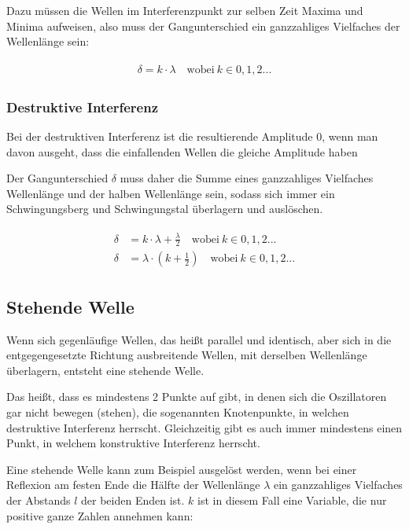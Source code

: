	Dazu müssen die Wellen im Interferenzpunkt zur selben Zeit Maxima und Minima aufweisen, also muss der Gangunterschied ein ganzzahliges Vielfaches der Wellenlänge sein:
	
	\begin{align}	\label{eq:kon_interferenz}
	\begin{split}
		\delta = k \cdot \lambda \quad \text{wobei} \ k \in 0,1,2...
	\end{split}
	\end{align}
	
	\subsubsection{Destruktive Interferenz}
	
	Bei der destruktiven Interferenz ist die resultierende Amplitude 0, wenn man davon ausgeht, dass die einfallenden Wellen die gleiche Amplitude haben
	
	Der Gangunterschied $\delta$ muss daher die Summe eines ganzzahliges Vielfaches Wellenlänge und der halben Wellenlänge sein, sodass sich immer ein Schwingungsberg und Schwingungstal überlagern und auslöschen.
	
	\begin{align}
	\begin{split}
		\delta &= k \cdot \lambda + \frac{\lambda}{2} \quad \text{wobei} \ k \in 0,1,2... \\
		\delta &= \lambda \cdot (k + \frac{1}{2}) \quad \text{wobei} \ k \in 0,1,2... 
	\end{split}
	\end{align}
	

\subsection{Stehende Welle}
	
Wenn sich gegenläufige Wellen, das heißt parallel und identisch, aber sich in die entgegengesetzte Richtung ausbreitende Wellen, mit derselben Wellenlänge überlagern, entsteht eine stehende Welle. 

Das heißt, dass es mindestens 2 Punkte auf gibt, in denen sich die Oszillatoren gar nicht bewegen (\glqq stehen\grqq), die sogenannten Knotenpunkte, in welchen destruktive Interferenz herrscht. Gleichzeitig gibt es auch immer mindestens einen Punkt, in welchem konstruktive Interferenz herrscht.
	
Eine stehende Welle kann zum Beispiel ausgelöst werden, wenn bei einer Reflexion am festen Ende die Hälfte der Wellenlänge $\lambda$ ein ganzzahliges Vielfaches der Abstands $l$ der beiden Enden ist. $k$ ist in diesem Fall eine Variable, die nur positive ganze Zahlen annehmen kann:
	
